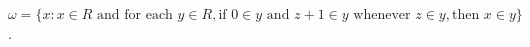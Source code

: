 $\omega = \{x: x \in R \text{ and for each } y \in R, \text{if } 0 \in y \text{ and } z + 1 \in y \text{ whenever } z \in y, \text{then } x \in y\}$.
